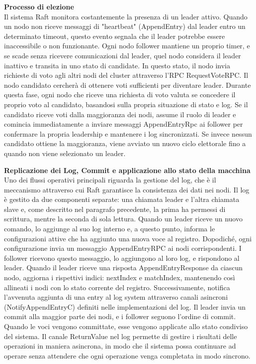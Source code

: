 \textbf{Processo di elezione}\\
Il sistema Raft monitora costantemente la presenza di un leader attivo. Quando un nodo non riceve messaggi di "heartbeat" (AppendEntry) dal leader entro un determinato timeout, questo evento segnala che il leader potrebbe essere 
inaccessibile o non funzionante. Ogni nodo follower mantiene un proprio timer, e se scade senza ricevere comunicazioni dal leader, quel nodo considera il leader inattivo e transita in uno stato di candidate.
In questo stato, il nodo invia richieste di voto agli altri nodi del cluster attraverso l'RPC RequestVoteRPC. Il nodo candidato cercherà di ottenere voti sufficienti per diventare leader. Durante questa fase, 
ogni nodo che riceve una richiesta di voto valuta se concedere il proprio voto al candidato, basandosi sulla propria situazione di stato e log.
Se il candidato riceve voti dalla maggioranza dei nodi, assume il ruolo di leader e comincia immediatamente a inviare messaggi AppendEntryRpc ai follower per confermare la propria leadership e mantenere i log sincronizzati. 
Se invece nessun candidato ottiene la maggioranza, viene avviato un nuovo ciclo elettorale fino a quando non viene selezionato un leader. 

\textbf{Replicazione dei Log, Commit e applicazione allo stato della macchina}\\
Uno dei flussi operativi principali riguarda la gestione del log, che è il meccanismo attraverso cui Raft garantisce la consistenza dei dati nei nodi. Il log è gestito da due componenti separate: una chiamata leader e l'altra 
chiamata slave e, come descritto nel paragrafo precedente, la prima ha permessi di scrittura, mentre la seconda di sola lettura.
Quando un leader riceve un nuovo comando, lo aggiunge al suo log interno e, a questo punto, informa le configurazioni attive che ha aggiunto una nuova voce al registro. Dopodiché, ogni configurazione invia un messaggio 
AppendEntryRPC ai nodi corrispondenti.
I follower ricevono questo messaggio, lo aggiungono al loro log, e rispondono al leader. 
Quando il leader riceve una risposta AppendEntryResponse da ciascun nodo, aggiorna i rispettivi indici: nextIndex e matchIndex, mantenendo così allineati i nodi con lo stato corrente del registro. Successivamente,
notifica l'avvenuta aggiunta di una entry al log system attraverso canali asincroni (NotifyAppendEntryC) definiti nelle implementazioni del log. Il leader invia un commit alla maggior parte dei nodi, e i follower seguono l'ordine di commit. 
Quando le voci vengono committate, esse vengono applicate allo stato condiviso del sistema.
Il canale ReturnValue nel log permette di gestire i risultati delle operazioni in maniera asincrona, in modo che il sistema possa continuare ad operare senza attendere che ogni operazione venga completata in modo sincrono.

